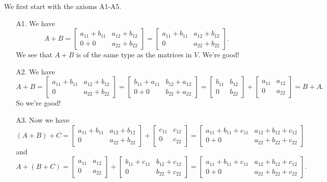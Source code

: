 \documentclass[12pt]{article}
\begin{document}
\begin{enumerate}
			We first start with the axioms A1-A5.
				\begin{enumerate}
				\item[A1.] We have
					\[
						A + B = \begin{bmatrix} a_{11} + b_{11} & a_{12} + b_{12} \\ 0 + 0 & a_{22} + b_{22} \end{bmatrix} = \begin{bmatrix} a_{11} + b_{11} & a_{12} + b_{12} \\ 0 & a_{22} + b_{22} \end{bmatrix} .
					\]
					We see that $A + B$ is of the same type as the matrices in $V$. We're good!
					\item[A2.] We have
						\[
							A + B = \begin{bmatrix} a_{11} + b_{11} & a_{12} + b_{12} \\ 0 & a_{22} + b_{22} \end{bmatrix} = \begin{bmatrix} b_{11} + a_{11} & b_{12} + a_{12} \\ 0 + 0 & b_{22} + a_{22} \end{bmatrix} = \begin{bmatrix} b_{11} & b_{12} \\ 0 & b_{22} \end{bmatrix} + \begin{bmatrix} a_{11} & a_{12} \\ 0 & a_{22} \end{bmatrix} = B + A .
						\]
						So we're good!
					\item[A3.] Now we have
						\[
							(A + B) + C = \begin{bmatrix} a_{11} + b_{11} & a_{12} + b_{12} \\ 0 & a_{22} + b_{22} \end{bmatrix} + \begin{bmatrix} c_{11} & c_{12} \\ 0 & c_{22} \end{bmatrix} = \begin{bmatrix} a_{11} + b_{11} + c_{11} & a_{12} + b_{12} + c_{12} \\ 0 + 0 & a_{22} + b_{22} + c_{22} \end{bmatrix}
						\]
					and
						\[
							A + (B + C) = \begin{bmatrix} a_{11} & a_{12} \\ 0 & a_{22} \end{bmatrix} + \begin{bmatrix} b_{11} + c_{11} & b_{12} + c_{12} \\ 0 & b_{22} + c_{22} \end{bmatrix} = \begin{bmatrix} a_{11} + b_{11} + c_{11} & a_{12} + b_{12} + c_{12} \\ 0 + 0 & a_{22} + b_{22} + c_{22} \end{bmatrix} .
\]
\end{enumerate}
\end{enumerate}
\end{document}
